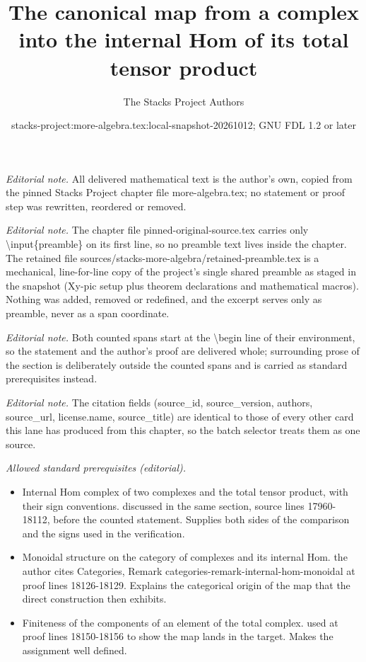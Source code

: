 \documentclass[10pt,a4paper]{amsart}
\title{The canonical map from a complex into the internal Hom of its total tensor product}
\author{The Stacks Project Authors}
\date{stacks-project:more-algebra.tex:local-snapshot-20261012; GNU FDL 1.2 or later}
\theoremstyle{plain}
\theoremstyle{definition}
\theoremstyle{remark}
\numberwithin{equation}{subsection}
\begin{document}
\maketitle
\setcounter{subsection}{1}
\noindent\textit{Editorial note.} All delivered mathematical text is the author's own, copied from the pinned Stacks Project chapter file more-algebra.tex; no statement or proof step was rewritten, reordered or removed.\par\medskip
\noindent\textit{Editorial note.} The chapter file pinned-original-source.tex carries only \textbackslash{}input\{preamble\} on its first line, so no preamble text lives inside the chapter. The retained file sources/stacks-more-algebra/retained-preamble.tex is a mechanical, line-for-line copy of the project's single shared preamble as staged in the snapshot (Xy-pic setup plus theorem declarations and mathematical macros). Nothing was added, removed or redefined, and the excerpt serves only as preamble, never as a span coordinate.\par\medskip
\noindent\textit{Editorial note.} Both counted spans start at the \textbackslash{}begin line of their environment, so the statement and the author's proof are delivered whole; surrounding prose of the section is deliberately outside the counted spans and is carried as standard prerequisites instead.\par\medskip
\noindent\textit{Editorial note.} The citation fields (source\_id, source\_version, authors, source\_url, license.name, source\_title) are identical to those of every other card this lane has produced from this chapter, so the batch selector treats them as one source.\par\medskip
\noindent\textit{Allowed standard prerequisites (editorial).}\begin{itemize}
\item Internal Hom complex of two complexes and the total tensor product, with their sign conventions. discussed in the same section, source lines 17960-18112, before the counted statement. Supplies both sides of the comparison and the signs used in the verification.
\item Monoidal structure on the category of complexes and its internal Hom. the author cites Categories, Remark categories-remark-internal-hom-monoidal at proof lines 18126-18129. Explains the categorical origin of the map that the direct construction then exhibits.
\item Finiteness of the components of an element of the total complex. used at proof lines 18150-18156 to show the map lands in the target. Makes the assignment well defined.
\end{itemize}\medskip
\end{document}
